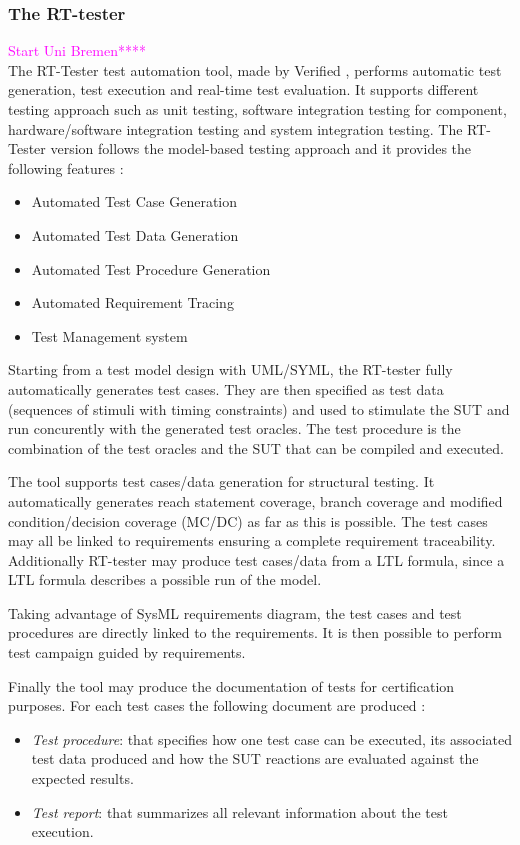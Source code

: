 \documentclass{template/openetcs_report}
\begin{document}
\subsubsection{The RT-tester} 
\textcolor{magenta}{Start Uni Bremen****\\ }
The RT-Tester test automation tool, made by Verified
\cite{verified_website}, performs automatic test generation, test
execution and real-time test evaluation.  It supports different
testing approach such as unit testing, software integration testing
for component, hardware/software integration testing and system
integration testing.  The RT-Tester version  follows the
model-based testing approach \cite{Peleska2011} and
it provides the following features :
\begin{itemize}
\item Automated Test Case Generation 
\item Automated Test Data Generation 
\item Automated Test Procedure Generation 
\item Automated Requirement Tracing 
\item Test Management system 
\end{itemize}
Starting from a test model design with UML/SYML, the RT-tester fully
automatically generates test cases. They are then specified as test
data (sequences of stimuli with timing constraints) and used to
stimulate the SUT and run concurently with the generated test
oracles. The test procedure is the combination of the test oracles and
the SUT that can be compiled and executed.

The tool supports test cases/data generation for structural
testing. It automatically generates  reach statement coverage, branch coverage and
modified condition/decision coverage (MC/DC) as far as this is possible.
The test cases may all be linked to requirements ensuring a complete
requirement traceability. 
Additionally RT-tester may produce test cases/data from a LTL
formula, since a LTL formula describes a possible run of the model.

Taking advantage of SysML requirements diagram, the test cases and
test procedures are directly linked to the requirements. It is then
possible to perform test campaign guided by requirements.

Finally the tool may produce the documentation of tests for
certification purposes. For each test cases the following document are
produced :
\begin{itemize}
\item {\em Test procedure}: that specifies  how one test case can be
  executed, its associated test data produced and how the SUT
  reactions are evaluated against the expected results.
\item {\em Test report}: that summarizes all relevant information
  about the test execution.
\end{itemize}
\end{document}
